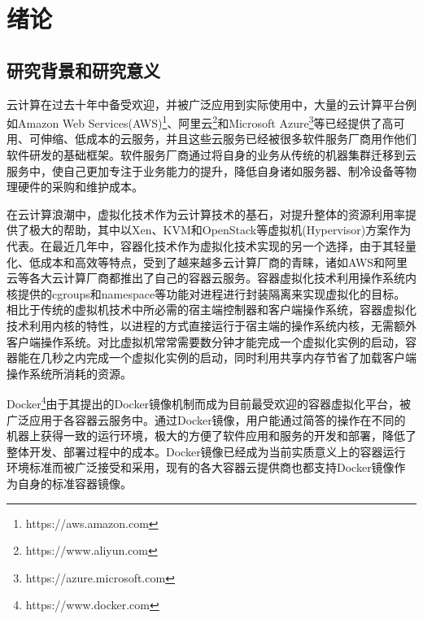 
\chapter{绪论}
\label{chap:intro}

\section{研究背景和研究意义}\label{sec:intro_bg}
云计算在过去十年中备受欢迎，并被广泛应用到实际使用中，大量的云计算平台例如Amazon Web Services(AWS)\footnote{https://aws.amazon.com}、阿里云\footnote{https://www.aliyun.com}和Microsoft Azure\footnote{https://azure.microsoft.com}等已经提供了高可用、可伸缩、低成本的云服务，并且这些云服务已经被很多软件服务厂商用作他们软件研发的基础框架。软件服务厂商通过将自身的业务从传统的机器集群迁移到云服务中，使自己更加专注于业务能力的提升，降低自身诸如服务器、制冷设备等物理硬件的采购和维护成本。

在云计算浪潮中，虚拟化技术作为云计算技术的基石\cite{zhang2010cloud}，对提升整体的资源利用率提供了极大的帮助，其中以Xen\cite{barham2003xen}、KVM\cite{kivity2007kvm}和OpenStack\cite{sefraoui2012openstack}等虚拟机(Hypervisor)\cite{buyya2010cloud}方案作为代表。在最近几年中，容器化技术作为虚拟化技术实现的另一个选择，由于其轻量化、低成本和高效等特点\cite{soltesz2007container}，受到了越来越多云计算厂商的青睐，诸如AWS和阿里云等各大云计算厂商都推出了自己的容器云服务。容器虚拟化技术利用操作系统内核提供的cgroups和namespace等功能对进程进行封装隔离来实现虚拟化的目标。相比于传统的虚拟机技术中所必需的宿主端控制器和客户端操作系统，容器虚拟化技术利用内核的特性，以进程的方式直接运行于宿主端的操作系统内核，无需额外客户端操作系统。对比虚拟机常常需要数分钟才能完成一个虚拟化实例的启动，容器能在几秒之内完成一个虚拟化实例的启动，同时利用共享内存节省了加载客户端操作系统所消耗的资源。

Docker\footnote{https://www.docker.com}由于其提出的Docker镜像机制而成为目前最受欢迎的容器虚拟化平台\cite{merkel2014docker}，被广泛应用于各容器云服务中。通过Docker镜像，用户能通过简答的操作在不同的机器上获得一致的运行环境，极大的方便了软件应用和服务的开发和部署，降低了整体开发、部署过程中的成本。Docker镜像已经成为当前实质意义上的容器运行环境标准而被广泛接受和采用，现有的各大容器云提供商也都支持Docker镜像作为自身的标准容器镜像。

